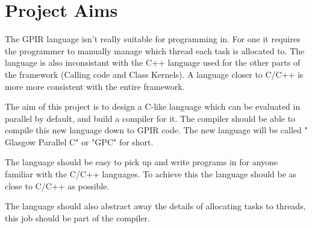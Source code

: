 \section{Project Aims}

The GPIR language isn't really suitable for programming in. For one it requires the programmer to manually
manage which thread each task is allocated to. The language is also inconsistant with the C++ language used for 
the other parts of the framework (Calling code and Class Kernels). A language closer to C/C++ is more
more consistent with the entire framework.

The aim of this project is to design a C-like language which can be evaluated in parallel by default, and build
a compiler for it. The compiler should be able to compile this new language down to GPIR code. The new language will
be called " Glasgow Parallel C" or "GPC" for short.

The language should be easy to pick up and write programs in for anyone familiar with the C/C++ languages.
To achieve this the language should be as close to C/C++ as possible. 

The language should also abstract away the details of allocating tasks to threads, this job
should be part of the compiler.

